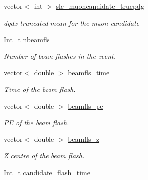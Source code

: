 \begin{DoxyCompactItemize}
\item 
vector$<$ int $>$ \hyperlink{classUBXSecEvent_a861fa153e7ab975f01780edfaf8f280c}{slc\-\_\-muoncandidate\-\_\-truepdg}
\begin{DoxyCompactList}\small\item\em dqdx truncated mean for the muon candidate \end{DoxyCompactList}\item 
\hypertarget{classUBXSecEvent_a2bf72740213db9d50d45c603eb3c549e}{Int\-\_\-t \hyperlink{classUBXSecEvent_a2bf72740213db9d50d45c603eb3c549e}{nbeamfls}}\label{classUBXSecEvent_a2bf72740213db9d50d45c603eb3c549e}

\begin{DoxyCompactList}\small\item\em Number of beam flashes in the event. \end{DoxyCompactList}\item 
\hypertarget{classUBXSecEvent_aff5ca08ec3a193029979e23b73d49d85}{vector$<$ double $>$ \hyperlink{classUBXSecEvent_aff5ca08ec3a193029979e23b73d49d85}{beamfls\-\_\-time}}\label{classUBXSecEvent_aff5ca08ec3a193029979e23b73d49d85}

\begin{DoxyCompactList}\small\item\em Time of the beam flash. \end{DoxyCompactList}\item 
\hypertarget{classUBXSecEvent_a3d703c077ccb0b00cacd04c6e751a2eb}{vector$<$ double $>$ \hyperlink{classUBXSecEvent_a3d703c077ccb0b00cacd04c6e751a2eb}{beamfls\-\_\-pe}}\label{classUBXSecEvent_a3d703c077ccb0b00cacd04c6e751a2eb}

\begin{DoxyCompactList}\small\item\em P\-E of the beam flash. \end{DoxyCompactList}\item 
\hypertarget{classUBXSecEvent_ac30df357368262d7a103ae9cd0bbd0d3}{vector$<$ double $>$ \hyperlink{classUBXSecEvent_ac30df357368262d7a103ae9cd0bbd0d3}{beamfls\-\_\-z}}\label{classUBXSecEvent_ac30df357368262d7a103ae9cd0bbd0d3}

\begin{DoxyCompactList}\small\item\em Z centre of the beam flash. \end{DoxyCompactList}\item 
\hypertarget{classUBXSecEvent_a84ab9cf932fabd0e1d9762ac07c75407}{Int\-\_\-t \hyperlink{classUBXSecEvent_a84ab9cf932fabd0e1d9762ac07c75407}{candidate\-\_\-flash\-\_\-time}}\label{classUBXSecEvent_a84ab9cf932fabd0e1d9762ac07c75407}


\end{DoxyCompactItemize}
